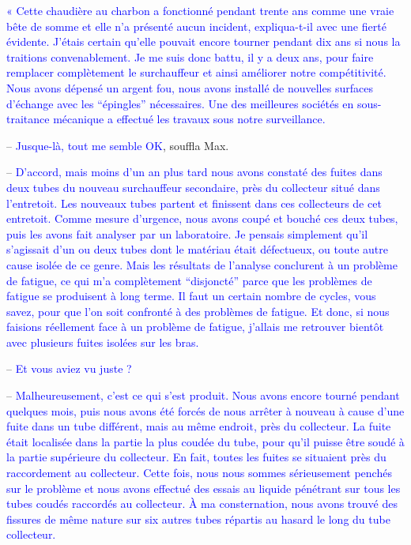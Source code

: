 \textcolor{blue}{« Cette chaudière au charbon a fonctionné pendant trente ans comme une vraie bête de somme et elle n’a présenté aucun incident, expliqua-t-il avec une fierté évidente. J’étais certain qu’elle pouvait encore tourner pendant dix ans si nous la traitions convenablement. Je me suis donc battu, il y a deux ans, pour faire remplacer complètement le surchauffeur et ainsi améliorer notre compétitivité. Nous avons dépensé un argent fou, nous avons installé de nouvelles surfaces d’échange avec les “épingles” nécessaires. Une des meilleures sociétés en sous-traitance mécanique a effectué les travaux sous notre surveillance.}

\vspace{0.3cm}


– \textcolor{blue}{Jusque-là, tout me semble OK}, souffla Max.

\vspace{0.3cm}

– \textcolor{blue}{D’accord, mais moins d’un an plus tard nous avons constaté des fuites dans deux tubes du nouveau surchauffeur secondaire, près du collecteur situé dans l’entretoit. Les nouveaux tubes partent et finissent dans ces collecteurs de cet entretoit. Comme mesure d’urgence, nous avons coupé et bouché ces deux tubes, puis les avons fait analyser par un laboratoire. Je pensais simplement qu’il s’agissait d’un ou deux tubes dont le matériau était défectueux, ou toute autre cause isolée de ce genre. Mais les résultats de l’analyse conclurent à un problème de fatigue, ce qui m’a complètement “disjoncté” parce que les problèmes de fatigue se produisent à long terme. Il faut un certain nombre de cycles, vous savez, pour que l’on soit confronté à des problèmes de fatigue. Et donc, si nous faisions réellement face à un problème de fatigue, j’allais me retrouver bientôt avec plusieurs fuites isolées sur les bras.}
\vspace{0.3cm}

–  \textcolor{blue}{Et vous aviez vu juste ?}

\vspace{0.3cm}

–  \textcolor{blue}{Malheureusement, c’est ce qui s’est produit. Nous avons encore tourné pendant quelques mois, puis nous avons été forcés de nous arrêter à nouveau à cause d’une fuite dans un tube différent, mais au même endroit, près du collecteur. La fuite était localisée dans la partie la plus coudée du tube, pour qu’il puisse être soudé à la partie supérieure du collecteur. En fait, toutes les fuites se situaient près du raccordement au collecteur. Cette fois, nous nous sommes sérieusement penchés sur le problème et nous avons effectué des essais au liquide pénétrant sur tous les tubes coudés raccordés au collecteur. À ma consternation, nous avons trouvé des fissures de même nature sur six autres tubes répartis au hasard le long du tube collecteur.}
\vspace{0.3cm}

